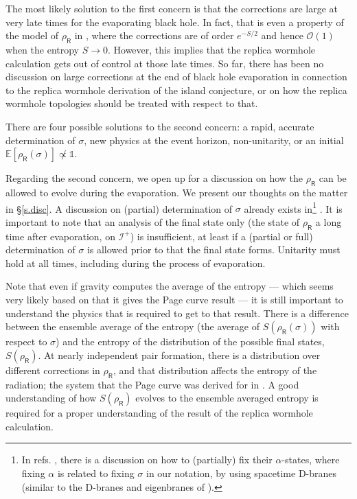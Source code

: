 \documentclass[12pt]{article}
\numberwithin{equation}{section}
\begin{document}
The most likely solution to the first concern is that the corrections are large at very late times for the evaporating black hole. In fact, that is even a property of the model of $\rho_\textsf{R}$ in \cite{Penington:2019kki}, where the corrections are of order $e^{-S/2}$ and hence $\mathcal{O}(1)$ when the entropy $S\rightarrow0$. However, this implies that the replica wormhole calculation gets out of control at those late times. So far, there has been no discussion on large corrections at the end of black hole evaporation in connection to the replica wormhole derivation of the island conjecture, or on how the replica wormhole topologies should be treated with respect to that.

There are four possible solutions to the second concern: a rapid, accurate determination of $\sigma$, new physics at the event horizon, non-unitarity, or an initial $\mathbb{E}[\rho_\textsf{R}(\sigma)]\not\propto \mathbb{1}$.

Regarding the second concern, we open up for a discussion on how the $\rho_\textsf{R}$ can be allowed to evolve during the evaporation. We present our thoughts on the matter in \S\ref{s.disc}. A discussion on (partial) determination of $\sigma$ already exists in\footnote{In refs. \cite{Marolf:2020xie,Marolf:2020rpm}, there is a discussion on how to (partially) fix their $\alpha$-states, where fixing $\alpha$ is related to fixing $\sigma$ in our notation, by using spacetime D-branes (similar to the D-branes and eigenbranes of \cite{Saad:2019lba,Blommaert:2019wfy}).} \cite{Marolf:2020xie,Marolf:2020rpm}. It is important to note that an analysis of the final state only (the state of $\rho_\textsf{R}$ a long time after evaporation, on $\mathcal{I}^+$) is insufficient, at least if a (partial or full) determination of $\sigma$ is allowed prior to that the final state forms. Unitarity must hold at all times, including during the process of evaporation.

Note that even if gravity computes the average of the entropy --- which seems very likely based on that it gives the Page curve result --- it is still important to understand the physics that is required to get to that result. There is a difference between the ensemble average of the entropy (the average of $S(\rho_\textsf{R}(\sigma))$ with respect to $\sigma$) and the entropy of the distribution of the possible final states, $S(\rho_\textsf{R})$. At nearly independent pair formation, there is a distribution over different corrections in $\rho_\textsf{R}$, and that distribution affects the entropy of the radiation; the system that the Page curve was derived for in \cite{Page:1993wv}. A good understanding of how $S(\rho_\textsf{R})$ evolves to the ensemble averaged entropy is required for a proper understanding of the result of the replica wormhole calculation.
\end{document}
